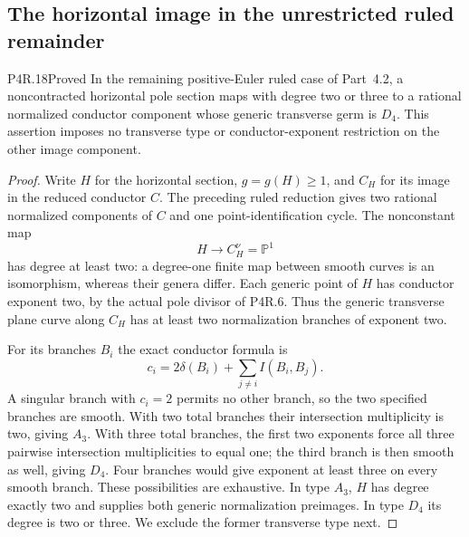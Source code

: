\subsection{The horizontal image in the unrestricted ruled remainder}

\begin{statement}{P4R.18}{Proved}
In the remaining positive-Euler ruled case of Part~4.2, a
noncontracted horizontal pole section maps with degree two or
three to a rational normalized conductor component whose generic
transverse germ is $D_4$. This assertion imposes no transverse
type or conductor-exponent restriction on the other image component.
\end{statement}
\begin{proof}
Write $H$ for the horizontal section, $g=g(H)\ge1$, and
$C_H$ for its image in the reduced conductor $C$. The preceding
ruled reduction gives two rational normalized components of $C$
and one point-identification cycle. The nonconstant map
\[
                         H\longrightarrow C_H^\nu=\mathbb P^1
\]
has degree at least two: a degree-one finite map between smooth
curves is an isomorphism, whereas their genera differ. Each
generic point of $H$ has conductor exponent two, by the actual
pole divisor of P4R.6. Thus the generic transverse plane curve
along $C_H$ has at least two normalization branches of exponent two.

For its branches $B_i$ the exact conductor formula is
\[
             c_i=2\delta(B_i)+\sum_{j\ne i}I(B_i,B_j).
\]
A singular branch with $c_i=2$ permits no other branch,
so the two specified branches are smooth. With two total
branches their intersection multiplicity is two, giving $A_3$.
With three total branches, the first two exponents force all
three pairwise intersection multiplicities to equal one;
the third branch is then smooth as well, giving $D_4$.
Four branches would give exponent at least three on every
smooth branch. These possibilities are exhaustive. In type
$A_3$, $H$ has degree exactly two and supplies both generic
normalization preimages. In type $D_4$ its degree is two or
three. We exclude the former transverse type next.


\end{proof}
